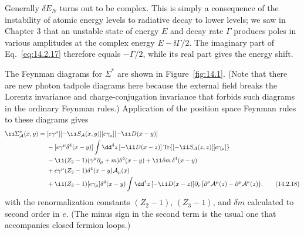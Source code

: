 Generally $\delta E_N$ turns out to be complex. This is simply a consequence
of the instability of atomic energy levels to radiative decay to lower levels;
we saw in Chapter 3 that an unstable state of energy $E$ and decay rate $\Gamma$
produces poles in various amplitudes at the complex energy $E-\ii\Gamma/2$. The
imaginary part of Eq.~\eqref{eq:14.2.17} therefore equals $-\Gamma/2$, while its
real part gives the energy shift.

The Feynman diagrams for $\Sigma^*$ are shown in Figure~\ref{fig:14.1}. (Note
that there are new photon tadpole diagrams here because the external field
breaks the Lorentz invariance and charge-conjugation invariance that forbids
such diagrams in the ordinary Feynman rules.) Application of the position
space Feynman rules to these diagrams gives
\begin{align}
 \ii\Sigma^*_{\mathcal A}(x,y)={}&
 [e\gamma^\mu][-\ii S_{\mathcal A}(x,y)][e\gamma_\mu][-\ii D(x-y)]
 \notag\\
 &-[e\gamma^\mu\delta^4(x-y)]\int \dd^4z\,[-\ii D(x-z)]
 \operatorname{Tr}\{[-\ii S_{\mathcal A}(z,z)][e\gamma_\mu]\}
 \notag\\
 &-\ii(Z_2-1)(\gamma^\mu\partial_\mu+m)\delta^4(x-y)
 +\ii\delta m\,\delta^4(x-y)
 \notag\\
 &+e\gamma^\mu(Z_2-1)\delta^4(x-y)\mathcal A_\mu(x)
 \notag\\
 &+\ii(Z_3-1)[e\gamma_\mu]\delta^4(x-y)\int \dd^4z\,[-\ii D(x-z)]
 \partial_\nu\bigl(\partial^\nu\mathcal A^\mu(z)-\partial^\mu\mathcal A^\nu(z)\bigr).
 \tag{14.2.18}\label{eq:14.2.18}
\end{align}
with the renormalization constants $(Z_2-1)$, $(Z_3-1)$, and $\delta m$
calculated to second order in $e$. (The minus sign in the second term is the
usual one that accompanies closed fermion loops.)

